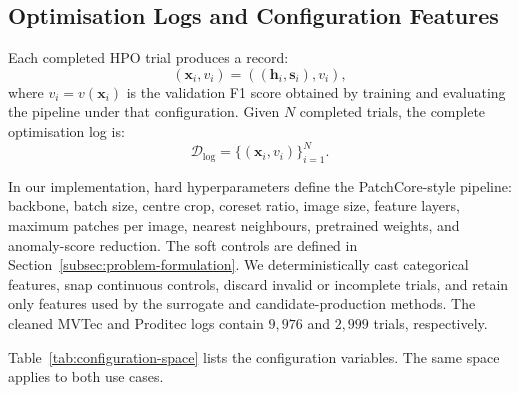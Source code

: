 \documentclass[final,5p,times,twocolumn]{elsarticle}
\begin{document}
\subsection{Optimisation Logs and Configuration Features}
\label{subsec:logs-features}

Each completed HPO trial produces a record:
\begin{equation}
    (\mathbf{x}_i, v_i) = ((\mathbf{h}_i, \mathbf{s}_i), v_i),
    \label{eq:trial-record}
\end{equation}
where $v_i = v(\mathbf{x}_i)$ is the validation F1 score obtained by
training and evaluating the pipeline under that configuration. Given
$N$ completed trials, the complete optimisation log is:
\begin{equation}
    \mathcal{D}_{\mathrm{log}} = \{(\mathbf{x}_i, v_i)\}_{i=1}^{N}.
    \label{eq:log-dataset}
\end{equation}

In our implementation, hard hyperparameters define the PatchCore-style
pipeline: backbone, batch size, centre crop, coreset ratio, image size,
feature layers, maximum patches per image, nearest neighbours,
pretrained weights, and anomaly-score reduction. The soft controls are defined in Section~\ref{subsec:problem-formulation}. We deterministically
cast categorical features, snap continuous controls, discard invalid or
incomplete trials, and retain only features used by the surrogate and
candidate-production methods. The cleaned MVTec and Proditec logs
contain $9{,}976$ and $2{,}999$ trials, respectively.

Table~\ref{tab:configuration-space} lists the configuration variables. The same space applies to both use cases.
\end{document}
